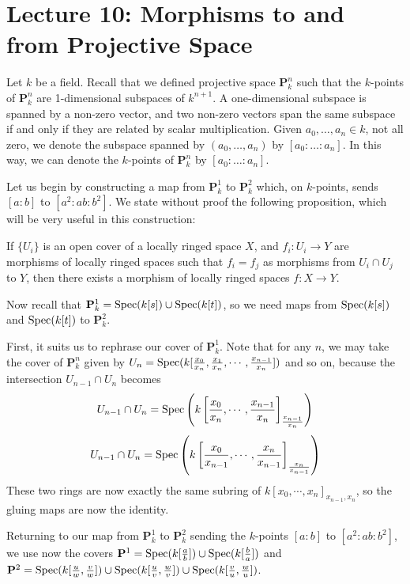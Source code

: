 \newpage

\section*{Lecture 10: Morphisms to and from Projective Space}
Let \(k\) be a field.
Recall that we defined projective space \(\mathbf{P}^n_{k}\) such that the \(k\)-points of \(\mathbf{P}^n_{k}\) are 1-dimensional subspaces of \(k^{n+1}\).
A one-dimensional subspace is spanned by a non-zero vector, and two non-zero vectors span the same subspace if and only if they are related by scalar multiplication.
Given \(a_0,\dots,a_n \in k\), not all zero, we denote the subspace spanned by \((a_0,\dots,a_n)\) by \([a_0:\dots:a_n]\).
In this way, we can denote the \(k\)-points of \(\mathbf{P}^n_{k}\) by \([a_0:\dots:a_n]\).

Let us begin by constructing a map from \(\mathbf{P}^1_k\) to \(\mathbf{P}^2_k\) which, on $k$-points, sends \([a:b]\) to \([a^2:ab:b^2]\). We state without proof the following proposition, which will be very useful in this construction:
\begin{proposition}\label{prop:morphisms-form-a-sheaf}
If \(\{U_i\}\) is an open cover of a locally ringed space \(X\), and \(f_i:U_i\to Y\) are morphisms of locally ringed spaces such that \(f_i = f_j\) as morphisms from \(U_i\cap U_j\) to \(Y\), then there exists a morphism of locally ringed spaces \(f:X\to Y\). 
\end{proposition}
Now recall that \(\mathbf{P}^1_k=  \operatorname{Spec}(k[s])\cup \operatorname{Spec}(k[t])\), so we need maps from \(\operatorname{Spec}(k[s])\) and \(\operatorname{Spec}(k[t])\) to \(\mathbf{P}^2_k\). 

First, it suits us to rephrase our cover of \(\mathbf{P}^1_k\). Note that for any \(n\), we may take the cover of \(\mathbf{P}^n_k\) given by \(U_n = \operatorname{Spec}(k[\frac{x_0}{x_n},\frac{x_1}{x_n},\cdots,\frac{x_{n-1}}{x_n}])\) and so on, because the intersection \(U_{n-1}\cap U_n\) becomes 
\[U_{n-1}\cap U_n = \operatorname{Spec}\left(k\left[\frac{x_0}{x_n},\cdots,\frac{x_{n-1}}{x_n}\right]_{\frac{x_{n-1}}{x_n}}\right)\]
\[U_{n-1}\cap U_n = \operatorname{Spec}\left(k\left[\frac{x_0}{x_{n-1}},\cdots,\frac{x_{n}}{x_{n-1}}\right]_{\frac{x_n}{x_{n-1}}}\right)\]
These two rings are now exactly the same subring of \(k[x_0,\cdots,x_n]_{x_{n-1},x_n}\), so the gluing maps are now the identity. 

Returning to our map from \(\mathbf{P}^1_k\) to \(\mathbf{P}^2_k\) sending the \(k\)-points \([a:b]\) to \([a^2:ab:b^2]\), we use now the covers \(\mathbf{P}^1 = \operatorname{Spec}(k[\frac{a}{b}])\cup \operatorname{Spec}(k[\frac b a])\) and \(\mathbf{P}^2 = \operatorname{Spec}(k[\frac u w, \frac v w ])\cup \operatorname{Spec}(k[\frac u v,\frac w v])\cup \operatorname{Spec}(k[\frac v u, \frac w u])\). 

